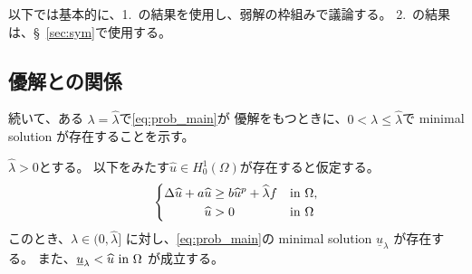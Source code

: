 以下では基本的に、1.~の結果を使用し、弱解の枠組みで議論する。
2.~の結果は、\S~\ref{sec:sym}で使用する。

\subsection{優解との関係}

続いて、ある
$\lambda = \hat{\lambda}$で\ref{eq:prob_main}が
優解をもつときに、$0 < \lambda \leq \hat{\lambda}$で
minimal solution が存在することを示す。

\begin{lem} \label{lem:minimal_itt}
 $\hat{\lambda} > 0$とする。
 以下をみたす$\hat{u} \in H_0^1(\Omega)$が存在すると仮定する。
\begin{align}
 \left\{
 \begin{aligned}
  \Delta \widehat{u} + a\widehat{u} &\geq b \widehat{u}^p + \widehat{\lambda}f  &
  &\text{in}~ \Omega,  \\
  \widehat{u} &> 0 & &\text{in}~ \Omega
 \end{aligned}
 \right. \label{eq:prob_lem_ifthm}
\end{align}
 このとき、$\lambda \in (0,\hat{\lambda} ]$
 に対し、\ref{eq:prob_main}の minimal solution $\underline{u}_\lambda$
 が存在する。
 また、$\underline{u}_\lambda < \widehat{u} ~\text{in}~ \Omega$
 が成立する。
\end{lem}

